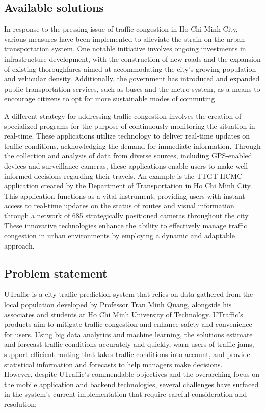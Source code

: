 \subsection{Available solutions}

In response to the pressing issue of traffic congestion in Ho Chi Minh City, various measures have been implemented to alleviate the strain on the urban transportation system. One notable initiative involves ongoing investments in infrastructure development, with the construction of new roads and the expansion of existing thoroughfares aimed at accommodating the city's growing population and vehicular density. Additionally, the government has introduced and expanded public transportation services, such as buses and the metro system, as a means to encourage citizens to opt for more sustainable modes of commuting.

A different strategy for addressing traffic congestion involves the creation of specialized programs for the purpose of continuously monitoring the situation in real-time. These applications utilize technology to deliver real-time updates on traffic conditions, acknowledging the demand for immediate information. Through the collection and analysis of data from diverse sources, including GPS-enabled devices and surveillance cameras, these applications enable users to make well-informed decisions regarding their travels. An example is the TTGT HCMC application created by the Department of Transportation in Ho Chi Minh City. This application functions as a vital instrument, providing users with instant access to real-time updates on the status of routes and visual information through a network of 685 strategically positioned cameras throughout the city. These innovative technologies enhance the ability to effectively manage traffic congestion in urban environments by employing a dynamic and adaptable approach.

\subsection{Problem statement}

UTraffic \cite{utraffic-introduction} is a city traffic prediction system that relies on data gathered from the local population developed by Professor Tran Minh Quang, alongside his associates and students at Ho Chi Minh University of Technology. UTraffic's products aim to mitigate traffic congestion and enhance safety and convenience for users. Using big data analytics and machine learning, the solutions estimate and forecast traffic conditions accurately and quickly, warn users of traffic jams, support efficient routing that takes traffic conditions into account, and provide statistical information and forecasts to help managers make decisions. \\
However, despite UTraffic's commendable objectives and the overarching focus on the mobile application and backend technologies, several challenges have surfaced in the system's current implementation that require careful consideration and resolution:


